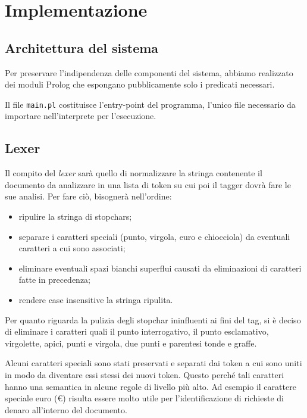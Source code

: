 
\section{Implementazione}

\subsection{Architettura del sistema}
Per preservare l'indipendenza delle componenti del sistema, abbiamo realizzato dei moduli Prolog che espongano pubblicamente solo i predicati necessari.

Il file \verb+main.pl+ costituisce l'entry-point del programma, l'unico file necessario da importare nell'interprete per l'esecuzione.


\subsection{Lexer}
Il compito del \emph{lexer} sarà quello di normalizzare la stringa contenente il documento da analizzare in una lista di token su cui poi il tagger dovrà fare le sue analisi. Per fare ciò, bisognerà nell'ordine:
\begin{itemize}
    \item ripulire la stringa di stopchars;
    \item separare i caratteri speciali (punto, virgola, euro e chiocciola) da eventuali caratteri a cui sono associati;
    \item eliminare eventuali spazi bianchi superflui causati da eliminazioni di caratteri fatte in precedenza;
    \item rendere case insensitive la stringa ripulita.
\end{itemize}

Per quanto riguarda la pulizia degli stopchar ininfluenti ai fini del tag, si è deciso di eliminare i caratteri quali il punto interrogativo, il punto esclamativo, virgolette, apici, punti e virgola, due punti e parentesi tonde e graffe.

Alcuni caratteri speciali sono stati preservati e separati dai token a cui sono uniti in modo da diventare essi stessi dei nuovi token. Questo perché tali caratteri hanno una semantica in alcune regole di livello più alto.
Ad esempio il carattere speciale euro (€) risulta essere molto utile per l'identificazione di richieste di denaro all'interno del documento.

